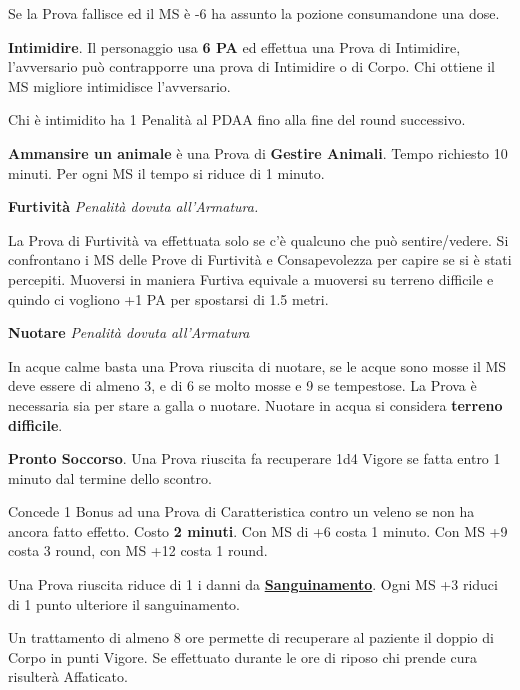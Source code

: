 \documentclass[12pt,a4paper,twoside,openany]{book}
\begin{document}
\begin{multicols}{2}
Se la Prova fallisce ed il MS è -6 ha assunto la pozione consumandone una dose.

\medskip

\textbf{Intimidire}. Il personaggio usa \textbf{6 PA} ed effettua una Prova di Intimidire, l'avversario può contrapporre una prova di Intimidire o di Corpo. Chi ottiene il MS migliore intimidisce l'avversario.

Chi è intimidito ha 1 Penalità al PDAA fino alla fine del round successivo.

\medskip

\textbf{Ammansire un animale} è una Prova di \textbf{Gestire Animali}. Tempo richiesto 10 minuti. Per ogni MS il tempo si riduce di 1 minuto.

\medskip

\textbf{Furtività}  \textit{Penalità dovuta all'Armatura.}

La Prova di Furtività va effettuata solo se c'è qualcuno che può sentire/vedere. Si confrontano i MS delle Prove di Furtività e Consapevolezza per capire se si è stati percepiti. Muoversi in maniera Furtiva equivale a muoversi su terreno difficile e quindo ci vogliono +1 PA per spostarsi di 1.5 metri.

\medskip

\textbf{Nuotare} \textit{Penalità dovuta all'Armatura}

In acque calme basta una Prova riuscita di nuotare, se le acque sono mosse il MS deve essere di almeno 3, e di 6 se molto mosse e 9 se tempestose. La Prova è necessaria sia per stare a galla o nuotare. Nuotare in acqua si considera \textbf{terreno difficile}.

\medskip

\textbf{Pronto Soccorso}\hypertarget{prontosoccorso}{}\label{prontosoccorso}. Una Prova riuscita fa recuperare 1d4 Vigore se fatta entro 1 minuto dal termine dello scontro.

Concede 1 Bonus ad una Prova di Caratteristica contro un veleno se non ha ancora fatto effetto. Costo \textbf{2 minuti}. Con MS di +6 costa 1 minuto. Con MS +9 costa 3 round, con MS +12 costa 1 round.

Una Prova riuscita riduce di 1 i danni da \hyperlink{sanguinamento}{\textbf{Sanguinamento}}. Ogni MS +3 riduci di 1 punto ulteriore il sanguinamento.

Un trattamento di almeno 8 ore permette di recuperare al paziente il doppio di Corpo in punti Vigore. Se effettuato durante le ore di riposo chi prende cura risulterà Affaticato.


\end{multicols}
\end{document}
